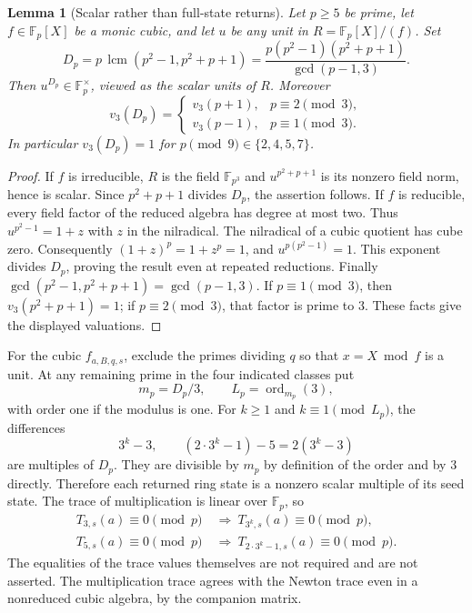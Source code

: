 \documentclass[11pt,a4paper]{article}
\newtheorem{lemma}[theorem]{Lemma}\newtheorem{proposition}[theorem]{Proposition}
\theoremstyle{definition}\newtheorem{definition}[theorem]{Definition}
\theoremstyle{remark}\newtheorem{remark}[theorem]{Remark}
\begin{document}
\begin{lemma}[Scalar rather than full-state returns]
\label{R11:syn:projective-universal}
Let $p\ge5$ be prime, let $f\in\mathbb F_p[X]$ be a monic cubic,
and let $u$ be any unit in $R=\mathbb F_p[X]/(f)$. Set
\[
 D_p=p\,\operatorname{lcm}(p^2-1,p^2+p+1)
     =\frac{p(p^2-1)(p^2+p+1)}{\gcd(p-1,3)}.
\]
Then $u^{D_p}\in\mathbb F_p^\times$, viewed as the scalar units of $R$.
Moreover
\[
 v_3(D_p)=
 \begin{cases}
  v_3(p+1),&p\equiv2\pmod3,\\
  v_3(p-1),&p\equiv1\pmod3.
 \end{cases}
\]
In particular $v_3(D_p)=1$ for
$p\pmod9\in\{2,4,5,7\}$.
\end{lemma}
\begin{proof}
If $f$ is irreducible, $R$ is the field $\mathbb F_{p^3}$ and
$u^{p^2+p+1}$ is its nonzero field norm, hence is scalar.
Since $p^2+p+1$ divides $D_p$, the assertion follows.
If $f$ is reducible, every field factor of the reduced algebra has
degree at most two. Thus $u^{p^2-1}=1+z$ with $z$ in the nilradical.
The nilradical of a cubic quotient has cube zero. Consequently
$(1+z)^p=1+z^p=1$, and $u^{p(p^2-1)}=1$.
This exponent divides $D_p$, proving the result even at repeated
reductions. Finally
$\gcd(p^2-1,p^2+p+1)=\gcd(p-1,3)$.
If $p\equiv1\pmod3$, then $v_3(p^2+p+1)=1$; if
$p\equiv2\pmod3$, that factor is prime to $3$.
These facts give the displayed valuations.
\end{proof}

For the cubic $f_{a,B,q,s}$, exclude the primes dividing $q$ so that
$x=X\bmod f$ is a unit. At any remaining prime in the four indicated
classes put
\[
 m_p=D_p/3,\qquad L_p=\operatorname{ord}_{m_p}(3),
\]
with order one if the modulus is one. For $k\ge1$ and
$k\equiv1\pmod{L_p}$, the differences
\[
 3^k-3,\qquad (2\cdot3^k-1)-5=2(3^k-3)
\]
are multiples of $D_p$. They are divisible by $m_p$ by definition
of the order and by $3$ directly. Therefore each returned ring
state is a nonzero scalar multiple of its seed state.
The trace of multiplication is linear over $\mathbb F_p$, so
\begin{equation}\label{R11:syn:projective-trace-return}
 \begin{split}
 T_{3,s}(a)\equiv0\pmod p
 &\ \Longrightarrow\ T_{3^k,s}(a)\equiv0\pmod p,\\
 T_{5,s}(a)\equiv0\pmod p
 &\ \Longrightarrow\ T_{2\cdot3^k-1,s}(a)\equiv0\pmod p.
 \end{split}
\end{equation}
The equalities of the trace values themselves are not required and
are not asserted. The multiplication trace agrees with the Newton
trace even in a nonreduced cubic algebra, by the companion matrix.
\end{document}
